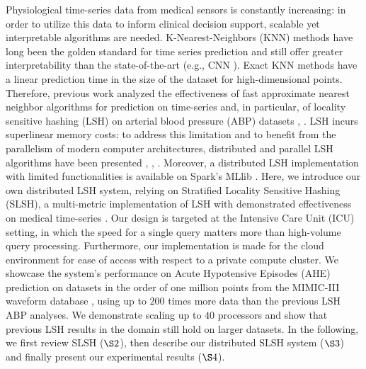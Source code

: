 \documentclass{article}
\begin{document}
Physiological time-series data from medical sensors is constantly increasing: in order to utilize this data to inform clinical decision support, scalable yet interpretable algorithms are needed. K-Nearest-Neighbors (KNN) methods have long been the golden standard for time series prediction \cite{Chen13, Xi06} and still offer greater interpretability than the state-of-the-art (e.g., CNN \cite{Wang16}). 
Exact KNN methods have a linear prediction time in the size of the dataset for high-dimensional points. Therefore, previous work analyzed the effectiveness of fast approximate nearest neighbor algorithms for prediction on time-series and, in particular, of locality sensitive hashing (LSH) on arterial blood pressure (ABP) datasets \cite{SLSHretrieval}, \cite{LSHprediction}. 
LSH incurs superlinear memory costs: to address this limitation and to benefit from the parallelism of modern computer architectures, distributed and parallel LSH algorithms have been presented \cite{Bahmani}, \cite{Haghani}, \cite{Sundaram}. Moreover, a distributed LSH implementation with limited functionalities is available on Spark's MLlib \cite{Spark}.
Here, we introduce our own distributed LSH system, relying on Stratified Locality Sensitive Hashing (SLSH), a multi-metric implementation of LSH with demonstrated effectiveness on medical time-series \cite{SLSHretrieval}.
Our design is targeted at the Intensive Care Unit (ICU) setting, in which the speed for a single query matters more than high-volume query processing. Furthermore, our implementation is made for the cloud environment for ease of access with respect to a private compute cluster.
We showcase the system's performance on Acute Hypotensive Episodes (AHE) prediction on datasets in the order of one million points from the MIMIC-III waveform database \cite{MIMICIII}, using up to $200$ times more data than the previous LSH ABP analyses. We demonstrate scaling up to $40$ processors and show that previous LSH results in the domain still hold on larger datasets.
In the following, we first review SLSH ($\S 2$), then describe our distributed SLSH system ($\S 3$) and finally present our experimental results ($\S 4$).
\end{document}
